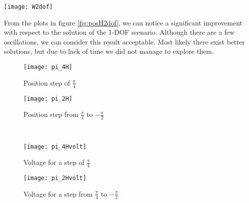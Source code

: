 \begin{figure*}[h]
	\centering
	\texttt{[image: W2dof]}
	\caption{Weighting functions}
\end{figure*}

From the plots in figure \ref{fig:posH2dof}, we can notice a significant improvement with respect to the solution of the 1-DOF scenario. Although there are a few oscillations, we can consider this result acceptable. Most likely there exist better solutions, but due to lack of time we did not manage to explore them.

 \begin{figure*}[h]
	\centering
	\begin{subfigure}{0.5\columnwidth}
		\texttt{[image: pi\_4H]}
		\caption{Position step of $\frac{\pi}{4}$}
	\end{subfigure}
	\begin{subfigure}{0.45\columnwidth}
		\texttt{[image: pi\_2H]}
		\caption{Position step from $\frac{\pi}{4}$ to $-\frac{\pi}{2}$}
	\end{subfigure}
	\\
	\begin{subfigure}{0.5\columnwidth}
		\texttt{[image: pi\_4Hvolt]}
		\caption{Voltage for a step of $\frac{\pi}{4}$}
	\end{subfigure}
	\begin{subfigure}{0.45\columnwidth}
		\texttt{[image: pi\_2Hvolt]}
		\caption{Voltage for a step from $\frac{\pi}{4}$ to $-\frac{\pi}{2}$}
	\end{subfigure}
	\caption{Position steps response}
	\label{fig:posH2dof}
\end{figure*}




 


